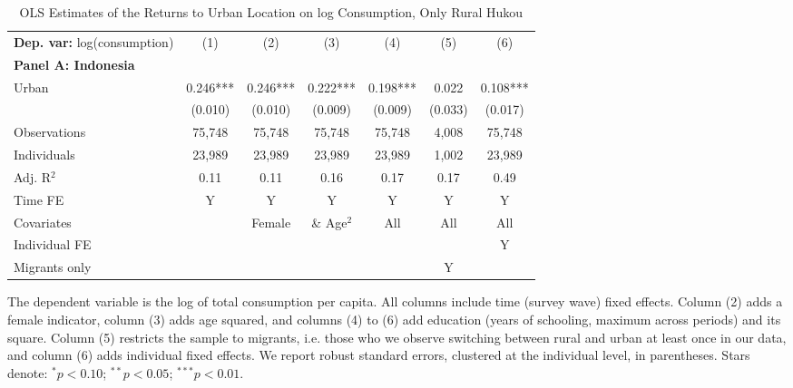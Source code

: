 \begin{table}[htbp] \centering \begin{threeparttable}
 \caption{OLS Estimates of the Returns to Urban Location on log Consumption, Only Rural Hukou} 
 \label{tab:OLS_CHN_hukou_rural_only_consumption_urban_unb} 
\begin{tabular}{l cccccc} \toprule  \textbf{Dep. var:}  log(consumption) 
                    &\multicolumn{1}{c}{(1)}   &\multicolumn{1}{c}{(2)}   &\multicolumn{1}{c}{(3)}   &\multicolumn{1}{c}{(4)}   &\multicolumn{1}{c}{(5)}   &\multicolumn{1}{c}{(6)}   \\
\textbf{Panel A: Indonesia} \\
Urban               &       0.246***&       0.246***&       0.222***&       0.198***&       0.022   &       0.108***\\
                    &     (0.010)   &     (0.010)   &     (0.009)   &     (0.009)   &     (0.033)   &     (0.017)   \\
\addlinespace
Observations        &      75,748   &      75,748   &      75,748   &      75,748   &       4,008   &      75,748   \\
Individuals         &      23,989   &      23,989   &      23,989   &      23,989   &       1,002   &      23,989   \\
Adj. R$^{2}$        &        0.11   &        0.11   &        0.16   &        0.17   &        0.17   &        0.49   \\
\cmidrule{2 -7} Time FE & Y & Y & Y & Y & Y & Y \\ Covariates & & Female & \& Age$^2$ & All & All & All \\ Individual FE & & & & & & Y \\ Migrants only & & & & & Y & \\ \bottomrule \end{tabular} \begin{tablenotes}[flushleft] \footnotesize \item{The dependent variable is the log of total consumption per capita. All columns include time (survey wave) fixed effects. Column (2) adds a female indicator, column (3) adds age squared, and columns (4) to (6) add education (years of schooling, maximum across periods) and its square. Column (5) restricts the sample to migrants, i.e. those who we observe switching between rural and urban at least once in our data, and column (6) adds individual fixed effects. We report robust standard errors, clustered at the individual level, in parentheses. Stars denote: $^{*} p<0.10$; $^{**} p<0.05$; $^{***} p<0.01$.} \end{tablenotes} \end{threeparttable} \end{table}
